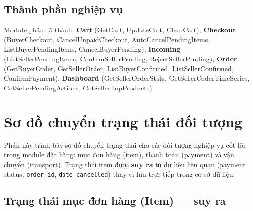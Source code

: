 \subsection{Thành phần nghiệp vụ}

Module phân rã thành: \textbf{Cart} (GetCart, UpdateCart, ClearCart), \textbf{Checkout} (BuyerCheckout, CancelUnpaidCheckout, AutoCancelPendingItems, ListBuyerPendingItems, CancelBuyerPending), \textbf{Incoming} (ListSellerPendingItems, ConfirmSellerPending, RejectSellerPending), \textbf{Order} (GetBuyerOrder, GetSellerOrder, ListBuyerConfirmed, ListSellerConfirmed, ConfirmPayment), \textbf{Dashboard} (GetSellerOrderStats, GetSellerOrderTimeSeries, GetSellerPendingActions, GetSellerTopProducts).

\section{Sơ đồ chuyển trạng thái đối tượng}

Phần này trình bày sơ đồ chuyển trạng thái cho các đối tượng nghiệp vụ cốt lõi trong module đặt hàng: mục đơn hàng (item), thanh toán (payment) và vận chuyển (transport). Trạng thái item được \textbf{suy ra} từ dữ liệu liên quan (payment status, \texttt{order\_id}, \texttt{date\_cancelled}) thay vì lưu trực tiếp trong cơ sở dữ liệu.

\subsection{Trạng thái mục đơn hàng (Item) --- suy ra}

